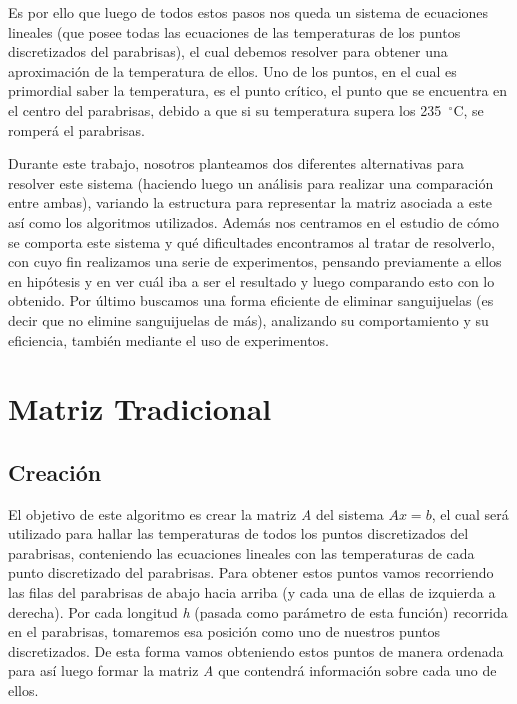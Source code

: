 \documentclass[10pt, a4paper]{article}
\begin{document}
Es por ello que luego de todos estos pasos nos queda un sistema de ecuaciones lineales (que posee todas las ecuaciones de las temperaturas de los puntos discretizados del parabrisas), el cual debemos resolver para obtener una aproximaci\'on de la temperatura de ellos. Uno de los puntos, en el cual es primordial saber la temperatura, es el punto cr\'itico, el punto que se encuentra en el centro del parabrisas, debido a que si su temperatura supera los 235\hspace{-1.5mm}$\phantom{a}^{\circ}$C, se romper\'a el parabrisas.

Durante este trabajo, nosotros planteamos dos diferentes alternativas para resolver este sistema (haciendo luego un an\'alisis para realizar una comparaci\'on entre ambas), variando la estructura para representar la matriz asociada a este as\'i como los algoritmos utilizados. Adem\'as nos centramos en el estudio de c\'omo se comporta este sistema y qu\'e dificultades encontramos al tratar de resolverlo, con cuyo fin realizamos una serie de experimentos, pensando previamente a ellos en hip\'otesis y en ver cu\'al iba a ser el resultado y luego comparando esto con lo obtenido. Por \'ultimo buscamos una forma eficiente de eliminar sanguijuelas (es decir que no elimine sanguijuelas de m\'as), analizando su comportamiento y su eficiencia, tambi\'en mediante el uso de experimentos.

\newpage

\section{Matriz Tradicional}
\subsection{Creaci\'on}
El objetivo de este algoritmo es crear la matriz \textit{A} del sistema $Ax=b$, el cual ser\'a utilizado para hallar las temperaturas de todos los puntos discretizados del parabrisas, conteniendo las ecuaciones lineales con las temperaturas de cada punto    discretizado del parabrisas. Para obtener estos puntos vamos recorriendo las filas del parabrisas de abajo hacia arriba (y cada una de ellas de izquierda a derecha). Por cada longitud \textit{h} (pasada como par\'ametro de esta funci\'on) recorrida en el parabrisas, tomaremos esa posici\'on como uno de nuestros puntos discretizados. De esta forma vamos obteniendo estos puntos de manera ordenada para as\'i luego formar la matriz \textit{A} que contendr\'a informaci\'on sobre cada uno de ellos. 
\end{document}
